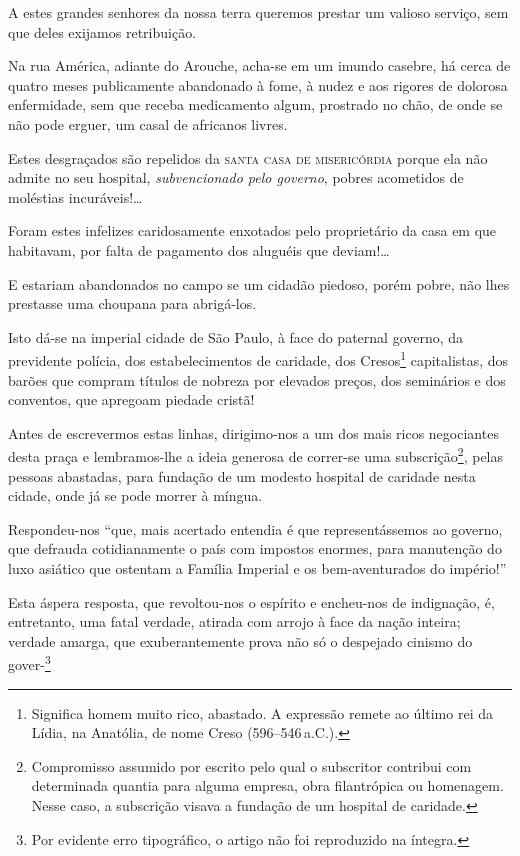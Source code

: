 A estes grandes senhores da nossa terra queremos prestar um valioso
serviço, sem que deles exijamos retribuição.

Na rua América, adiante do Arouche, acha-se em um imundo casebre, há
cerca de quatro meses publicamente abandonado à fome, à nudez e aos
rigores de dolorosa enfermidade, sem que receba medicamento algum,
prostrado no chão, de onde se não pode erguer, um casal de africanos
livres.

Estes desgraçados são repelidos da \textsc{santa casa de misericórdia} porque ela
não admite no seu hospital, \emph{subvencionado pelo governo}, pobres
acometidos de moléstias incuráveis!\ldots{}

Foram estes infelizes caridosamente enxotados pelo proprietário da casa
em que habitavam, por falta de pagamento dos aluguéis que
deviam!\ldots{}

E estariam abandonados no campo se um cidadão piedoso, porém pobre, não
lhes prestasse uma choupana para abrigá-los.

Isto dá-se na imperial cidade de São Paulo, à face do paternal governo,
da previdente polícia, dos estabelecimentos de caridade, dos
Cresos\footnote{Significa homem muito rico, abastado. A expressão
  remete ao último rei da Lídia, na Anatólia, de nome Creso (596--546\,a.C.).} 
  capitalistas, dos barões que compram títulos de nobreza por
elevados preços, dos seminários e dos conventos, que apregoam piedade
cristã!

Antes de escrevermos estas linhas, dirigimo-nos a um dos mais ricos
negociantes desta praça e lembramos-lhe a ideia generosa de correr-se
uma subscrição\footnote{Compromisso assumido por escrito pelo qual o
  subscritor contribui com determinada quantia para alguma empresa, obra
  filantrópica ou homenagem. Nesse caso, a subscrição visava a fundação
  de um hospital de caridade.}, pelas pessoas abastadas, para fundação
de um modesto hospital de caridade nesta cidade, onde já se pode morrer
à míngua.

Respondeu-nos ``que, mais acertado entendia é que representássemos ao
governo, que defrauda cotidianamente o país com impostos enormes, para
manutenção do luxo asiático que ostentam a Família Imperial e os
bem-aventurados do império!''

Esta áspera resposta, que revoltou-nos o espírito e encheu-nos de
indignação, é, entretanto, uma fatal verdade, atirada com arrojo à face
da nação inteira; verdade amarga, que exuberantemente prova não só o
despejado cinismo do gover-\footnote{Por evidente erro tipográfico, o
  artigo não foi reproduzido na íntegra.}

